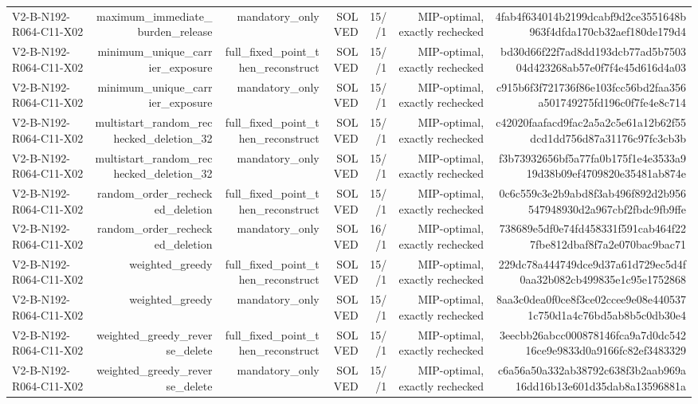 {\begin{longtable}{lrrrrrr}
V2-B-N192-R064-C11-X02 & maximum\_immediate\_burden\_release & mandatory\_only & SOLVED & 15//1 & MIP-optimal, exactly rechecked & 4fab4f634014b2199dcabf9d2ce3551648b963f4dfda170cb32aef180de179d4 \\
V2-B-N192-R064-C11-X02 & minimum\_unique\_carrier\_exposure & full\_fixed\_point\_then\_reconstruct & SOLVED & 15//1 & MIP-optimal, exactly rechecked & bd30d66f22f7ad8dd193dcb77ad5b750304d423268ab57e0f7f4e45d616d4a03 \\
V2-B-N192-R064-C11-X02 & minimum\_unique\_carrier\_exposure & mandatory\_only & SOLVED & 15//1 & MIP-optimal, exactly rechecked & c915b6f3f721736f86e103fcc56bd2faa356a501749275fd196c0f7fe4e8c714 \\
V2-B-N192-R064-C11-X02 & multistart\_random\_rechecked\_deletion\_32 & full\_fixed\_point\_then\_reconstruct & SOLVED & 15//1 & MIP-optimal, exactly rechecked & c42020faafacd9fac2a5a2c5e61a12b62f55dcd1dd756d87a31176c97fc3cb3b \\
V2-B-N192-R064-C11-X02 & multistart\_random\_rechecked\_deletion\_32 & mandatory\_only & SOLVED & 15//1 & MIP-optimal, exactly rechecked & f3b73932656bf5a77fa0b175f1e4e3533a919d38b09ef4709820e35481ab874e \\
V2-B-N192-R064-C11-X02 & random\_order\_rechecked\_deletion & full\_fixed\_point\_then\_reconstruct & SOLVED & 15//1 & MIP-optimal, exactly rechecked & 0c6c559c3e2b9abd8f3ab496f892d2b956547948930d2a967cbf2fbdc9fb9ffe \\
V2-B-N192-R064-C11-X02 & random\_order\_rechecked\_deletion & mandatory\_only & SOLVED & 16//1 & MIP-optimal, exactly rechecked & 738689e5df0e74fd458331f591cab464f227fbe812dbaf8f7a2e070bac9bac71 \\
V2-B-N192-R064-C11-X02 & weighted\_greedy & full\_fixed\_point\_then\_reconstruct & SOLVED & 15//1 & MIP-optimal, exactly rechecked & 229dc78a444749dce9d37a61d729ec5d4f0aa32b082cb499835e1c95e1752868 \\
V2-B-N192-R064-C11-X02 & weighted\_greedy & mandatory\_only & SOLVED & 15//1 & MIP-optimal, exactly rechecked & 8aa3c0dea0f0ce8f3ce02ccee9e08e4405371c750d1a4c76bd5ab8b5c0db30e4 \\
V2-B-N192-R064-C11-X02 & weighted\_greedy\_reverse\_delete & full\_fixed\_point\_then\_reconstruct & SOLVED & 15//1 & MIP-optimal, exactly rechecked & 3eecbb26abcc000878146fca9a7d0dc54216ce9e9833d0a9166fc82ef3483329 \\
V2-B-N192-R064-C11-X02 & weighted\_greedy\_reverse\_delete & mandatory\_only & SOLVED & 15//1 & MIP-optimal, exactly rechecked & c6a56a50a332ab38792c638f3b2aab969a16dd16b13e601d35dab8a13596881a \\

\end{longtable}}
